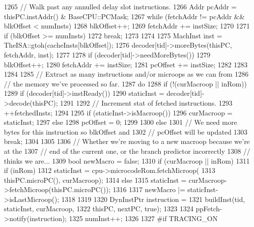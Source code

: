 \begin{DoxyCode}
{{{{1265                 // Walk past any annulled delay slot instructions.
1266                 Addr pcAddr = thisPC.instAddr() & BaseCPU::PCMask;
1267                 while (fetchAddr != pcAddr && blkOffset < numInsts) {
1268                     blkOffset++;
1269                     fetchAddr += instSize;
1270                 }
1271                 if (blkOffset >= numInsts)
1272                     break;
1273             }
1274 
1275             MachInst inst = TheISA::gtoh(cacheInsts[blkOffset]);
1276             decoder[tid]->moreBytes(thisPC, fetchAddr, inst);
1277 
1278             if (decoder[tid]->needMoreBytes()) {
1279                 blkOffset++;
1280                 fetchAddr += instSize;
1281                 pcOffset += instSize;
1282             }
1283         }
1284 
1285         // Extract as many instructions and/or microops as we can from
1286         // the memory we've processed so far.
1287         do {
1288             if (!(curMacroop || inRom)) {
1289                 if (decoder[tid]->instReady()) {
1290                     staticInst = decoder[tid]->decode(thisPC);
1291 
1292                     // Increment stat of fetched instructions.
1293                     ++fetchedInsts;
1294 
1295                     if (staticInst->isMacroop()) {
1296                         curMacroop = staticInst;
1297                     } else {
1298                         pcOffset = 0;
1299                     }
1300                 } else {
1301                     // We need more bytes for this instruction so blkOffset and
1302                     // pcOffset will be updated
1303                     break;
1304                 }
1305             }
1306             // Whether we're moving to a new macroop because we're at the
1307             // end of the current one, or the branch predictor incorrectly
1308             // thinks we are...
1309             bool newMacro = false;
1310             if (curMacroop || inRom) {
1311                 if (inRom) {
1312                     staticInst = cpu->microcodeRom.fetchMicroop(
1313                             thisPC.microPC(), curMacroop);
1314                 } else {
1315                     staticInst = curMacroop->fetchMicroop(thisPC.microPC());
1316                 }
1317                 newMacro |= staticInst->isLastMicroop();
1318             }
1319 
1320             DynInstPtr instruction =
1321                 buildInst(tid, staticInst, curMacroop,
1322                           thisPC, nextPC, true);
1323 
1324             ppFetch->notify(instruction);
1325             numInst++;
1326 
1327 #if TRACING_ON
}}}
\end{DoxyCode}
